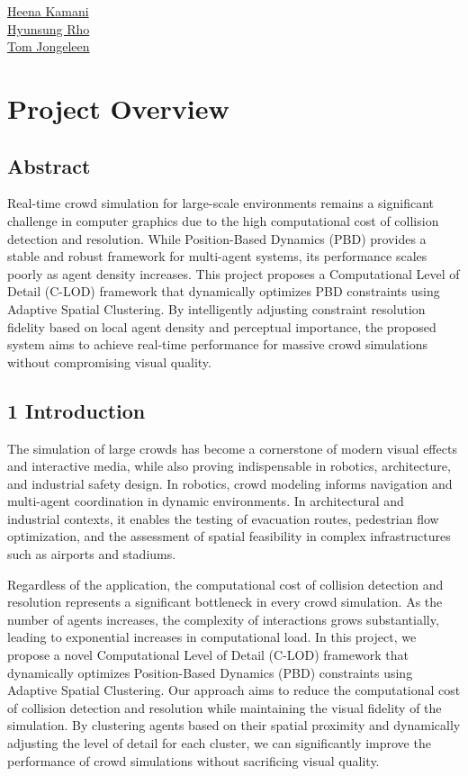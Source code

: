 

\begin{center}
{\small
\href{mailto:Hkamani@ualberta.ca}{Heena Kamani} \\
\href{mailto:hrho@ualberta.ca}{Hyunsung Rho} \\
\href{mailto:tjongele@ualberta.ca}{Tom Jongeleen}
}
\end{center}

\section{Project Overview}

\subsection{Abstract} 

Real-time crowd simulation for large-scale environments remains a significant challenge in computer graphics due to the high computational cost of collision detection and resolution. While Position-Based Dynamics (PBD) provides a stable and robust framework for multi-agent systems, its performance scales poorly as agent density increases. This project proposes a Computational Level of Detail (C-LOD) framework that dynamically optimizes PBD constraints using Adaptive Spatial Clustering. By intelligently adjusting constraint resolution fidelity based on local agent density and perceptual importance, the proposed system aims to achieve real-time performance for massive crowd simulations without compromising visual quality.

\subsection{1 Introduction} 

The simulation of large crowds has become a cornerstone of modern visual effects and interactive media, while also proving indispensable in robotics, architecture, and industrial safety design. In robotics, crowd modeling informs navigation and multi-agent coordination in dynamic environments. In architectural and industrial contexts, it enables the testing of evacuation routes, pedestrian flow optimization, and the assessment of spatial feasibility in complex infrastructures such as airports and stadiums.  

Regardless of the application, the computational cost of collision detection and resolution represents a significant bottleneck in every crowd simulation. As the number of agents increases, the complexity of interactions grows substantially, leading to exponential increases in computational load. In this project, we propose a novel Computational Level of Detail (C-LOD) framework that dynamically optimizes Position-Based Dynamics (PBD) constraints using Adaptive Spatial Clustering. Our approach aims to reduce the computational cost of collision detection and resolution while maintaining the visual fidelity of the simulation. By clustering agents based on their spatial proximity and dynamically adjusting the level of detail for each cluster, we can significantly improve the performance of crowd simulations without sacrificing visual quality.